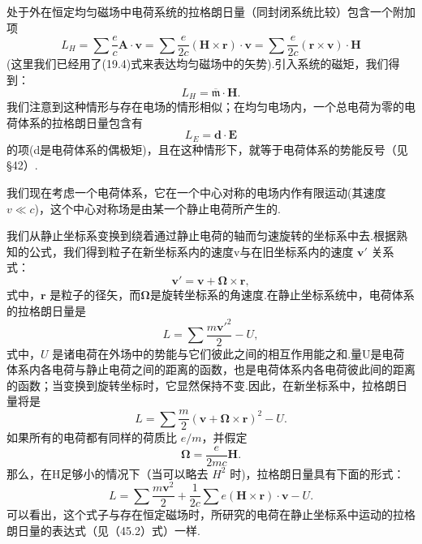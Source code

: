 处于外在恒定均匀磁场中电荷系统的拉格朗日量（同封闭系统比较）包含一个附加项
\begin{equation}
  L_H=\sum\frac{e}{c}\boldsymbol{A}\cdot\boldsymbol{v}
  =\sum\frac{e}{2c}(\boldsymbol{H}\times\boldsymbol{r})\cdot\boldsymbol{v}
  =\sum\frac{e}{2c}(\boldsymbol{r}\times\boldsymbol{v})\cdot\boldsymbol{H}
\end{equation}
(这里我们已经用了(19.4)式来表达均匀磁场中的矢势).引入系统的磁矩，我们得到：
\begin{equation}
  L_H=\overline{\mathfrak{m}}\cdot\boldsymbol{H}.
\end{equation}
我们注意到这种情形与存在电场的情形相似；在均匀电场内，一个总电荷为零的电荷体系的拉格朗日量包含有
\begin{equation*}
  L_E=\boldsymbol{d}\cdot\boldsymbol{E}
\end{equation*}
的项(d是电荷体系的偶极矩)，且在这种情形下，就等于电荷体系的势能反号（见 §42）.

我们现在考虑一个电荷体系，它在一个中心对称的电场内作有限运动(其速度 $v\ll c$)，这个中心对称场是由某一个静止电荷所产生的.

我们从静止坐标系变换到绕着通过静止电荷的轴而匀速旋转的坐标系中去.根据熟知的公式，我们得到粒子在新坐标系内的速度v与在旧坐标系内的速度 $\boldsymbol{v}'$ 关系式：
\begin{equation*}
  \boldsymbol{v}'=\boldsymbol{v}+\boldsymbol{\Omega}\times\boldsymbol{r},
\end{equation*}
式中，$\boldsymbol{r}$ 是粒子的径矢，而$\boldsymbol{\Omega}$是旋转坐标系的角速度.在静止坐标系统中，电荷体系的拉格朗日量是
\begin{equation*}
  L=\sum\frac{m\boldsymbol{v}'^2}{2}-U,
\end{equation*}
式中，$U$ 是诸电荷在外场中的势能与它们彼此之间的相互作用能之和.量U是电荷体系内各电荷与静止电荷之间的距离的函数，也是电荷体系内各电荷彼此间的距离的函数；当变换到旋转坐标时，它显然保持不变.因此，在新坐标系中，拉格朗日量将是
\begin{equation*}
  L=\sum\frac{m}{2}(\boldsymbol{v}+\boldsymbol{\Omega}\times\boldsymbol{r})^2-U.
\end{equation*}
如果所有的电荷都有同样的荷质比 $e/m$，并假定
\begin{equation}
  \boldsymbol{\Omega}=\frac{e}{2mc}\boldsymbol{H}.
\end{equation}
那么，在H足够小的情况下（当可以略去 $H^2$ 时)，拉格朗日量具有下面的形式：
\begin{equation*}
  L=\sum\frac{m\boldsymbol{v}^2}{2}
  +\frac{1}{2c}\sum e(\boldsymbol{H}\times\boldsymbol{r})\cdot\boldsymbol{v}-U.
\end{equation*}
可以看出，这个式子与存在恒定磁场时，所研究的电荷在静止坐标系中运动的拉格朗日量的表达式（见（45.2）式）一样.

